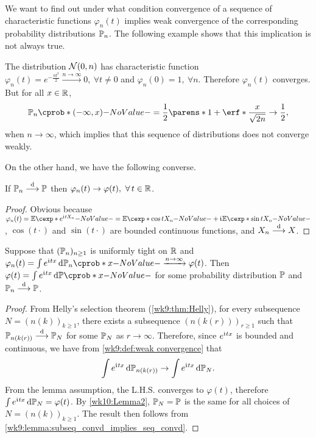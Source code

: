 \documentclass[12pt]{article}
\begin{document}
We want to find out under what condition convergence of a sequence of characteristic functions $\varphi_n(t)$ implies weak convergence of the corresponding probability distributions $\P_n$. The following example shows that this implication is not always true.

\begin{Example}\label{wk10:example1}
The distribution $\mathcal{N}(0,n)$ has characteristic function $\varphi_n(t)= e^{-\frac{n t^2}{2}}\xrightarrow{n\to \infty}0, \ \forall t \neq 0$ and $\varphi_n(0)=1,\ \forall n$. Therefore $\varphi_n(t)$ converges. But for all $x\in\mathbb{R}$,
\begin{align*}
\P_n((-\infty,x))=\frac{1}{2}\parens*{1+\erf*{\frac{x}{\sqrt{2n}}}}\to \frac{1}{2},
\end{align*} 
when $n\to \infty$, which implies that this sequence of distributions does not converge weakly.
\end{Example} 

On the other hand, we have the following converse. 
\begin{Lemma}\label{wk10:Lemma4}
If $\P_n\convd \P$ then $ \varphi_n(t) \to \varphi(t),\ \forall t \in \Real$. 
\end{Lemma}
\begin{proof}
Obvious because $\varphi_n(t)=\E[e^{\iu tX_n}]=\E [\cos t X_n]+\iu\E [\sin t X_n]$, $\cos(t\cdot)$ and $\sin(t\cdot)$ are bounded continuous functions, and $X_n \stackrel{\mathrm{d}}{\longrightarrow} X$. 
\end{proof}
 
\begin{Lemma}\label{wk10:lem:uniformly_tight_and_varphi_conv_implies_convd}
Suppose that $(\P_n)_{n\geq 1}$ is uniformly tight on $\mathbb{R}$ and $\varphi_n(t)=\int e^{\iu tx} \ud \P_n(x) \xrightarrow{n \to \infty} \varphi(t)$. Then $\varphi(t)=\int e^{\iu tx}\ud \P(x)$ for some probability distribution $\P$ and $\P_n\convd\P$. 
\end{Lemma}
\begin{proof}
From Helly's selection theorem (\cref{wk9:thm:Helly}), for every subsequence $N=(n(k))_{k\geq1}$, there exists a subsequence $(n(k(r)))_{r\geq1}$ such that $\P_{n(k(r))} \convd \P_N$ for some $\P_N$ as $r\to\infty$. Therefore, since $e^{\mathfrak{i}\mkern1mu tx}$ is bounded and continuous, we have from \cref{wk9:def:weak convergence} that
\begin{align*}
\int e^{\iu tx} \ud \P_{n(k(r))}\to \int e^{\iu tx} \ud \P_N.
\end{align*}
From the lemma assumption, the L.H.S. converges to $\varphi(t)$, therefore $\int e^{\iu tx} \ud \P_N =\varphi(t)$. By \cref{wk10:Lemma2}, $\P_N = \P$ is the same for all choices of $N=(n(k))_{k\geq1}$. The result then follows from \cref{wk9:lemma:subseq_convd_implies_seq_convd}.
\end{proof}
\end{document}
